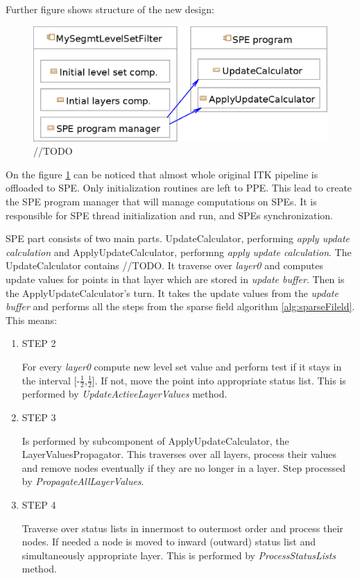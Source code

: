 Further figure shows structure of the new design:

\begin{figure}
    \centering
    \includegraphics[width=15cm]{data/newDesign}
    \caption[Diagram of new design components]{//TODO}
    \label{fg:newDesign}
\end{figure}

On the figure \ref{fg:newDesign} can be noticed that almost whole original ITK pipeline is offloaded to SPE.
Only initialization routines are left to PPE. This lead to create the SPE program manager that will manage computations on SPEs.
It is responsible for SPE thread initialization and run, and SPEs synchronization.

SPE part consists of two main parts.
UpdateCalculator, performing \emph{apply update calculation} and ApplyUpdateCalculator, performng \emph{apply update calculation}.
The UpdateCalculator contains //TODO. It traverse over \emph{layer0} and computes update values for points in that layer which are stored in \emph{update buffer}.
Then is the ApplyUpdateCalculator's turn.
It takes the update values from the \emph{update buffer} and performs all the steps from the sparse field algorithm \ref{alg:sparseFileld}.
This means:
\begin{enumerate}
\item STEP 2
\par
For every \emph{layer0} compute new level set value and perform test if it stays in the interval [-$\frac{1}{2}$,$\frac{1}{2}$].
If not, move the point into appropriate status list.
This is performed by \emph{UpdateActiveLayerValues} method.

\item STEP 3
\par
Is performed by subcomponent of ApplyUpdateCalculator, the LayerValuesPropagator.
This traverses over all layers, process their values and remove nodes eventually if they are no longer in a layer.
Step processed by \emph{PropagateAllLayerValues}.

\item STEP 4
\par
Traverse over status lists in innermost to outermost order and process their
nodes. If needed a node is moved to inward (outward) status list and
simultaneously appropriate layer. This is performed by \emph{ProcessStatusLists}
method.
\end{enumerate}

